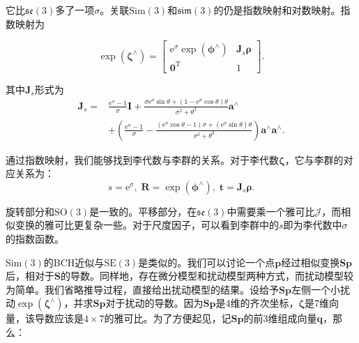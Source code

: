 它比$\mathfrak{se}(3)$多了一项$\sigma$。关联$\mathrm{Sim}(3)$和$\mathfrak{sim}(3)$的仍是指数映射和对数映射。指数映射为

\begin{equation}
\exp \left( {{ \boldsymbol{\zeta} ^ \wedge }} \right) = \left[ {\begin{array}{*{20}{c}}
	{{\mathrm{e}^\sigma }\exp \left( {{ \boldsymbol{\phi} ^ \wedge }} \right)}&{ \bm{J}_s \boldsymbol{\rho} }\\
	{{\bm{0}^\mathrm{T}}}&1
	\end{array}} \right].
\end{equation}

其中$\bm{J}_s$形式为
\begin{align*}
{ \bm{J}_s} =& \frac{{{\mathrm{e}^\sigma } - 1}}{\sigma } \bm{I} + \frac{ \sigma {{\mathrm{e}^\sigma }\sin \theta  + \left( {1 - {\mathrm{e}^\sigma }\cos \theta } \right)\theta }}{{{\sigma ^2} + {\theta ^2}}}{\bm{a}^ \wedge }\\
 &+ \left( {\frac{{{\mathrm{e}^\sigma } - 1}}{\sigma } - \frac{{\left( {{\mathrm{e}^\sigma }\cos \theta  - 1} \right)\sigma  + ({\mathrm{e}^\sigma }\sin \theta )\theta }}{{{\sigma ^2} + {\theta ^2}}}} \right){\bm{a}^ \wedge }{\bm{a}^ \wedge }.
\end{align*}

通过指数映射，我们能够找到李代数与李群的关系。对于李代数$\boldsymbol{\zeta}$，它与李群的对应关系为：
\begin{equation}
s=\mathrm{e}^\sigma, \; \bm{R} = \exp( \boldsymbol{\phi} ^\wedge), \; \bm{t} = \bm{J}_s \boldsymbol{\rho}.
\end{equation}

旋转部分和$\mathrm{SO}(3)$是一致的。平移部分，在$\mathfrak{se}(3)$中需要乘一个雅可比$\bm{\mathcal{J}}$，而相似变换的雅可比更复杂一些。对于尺度因子，可以看到李群中的$s$即为李代数中$\sigma$的指数函数。

$\mathrm{Sim}(3)$的BCH近似与$\mathrm{SE}(3)$是类似的。我们可以讨论一个点$\bm{p}$经过相似变换$\bm{S} \bm{p}$后，相对于$\bm{S}$的导数。同样地，存在微分模型和扰动模型两种方式，而扰动模型较为简单。我们省略推导过程，直接给出扰动模型的结果。设给予$\bm{S} \bm{p}$左侧一个小扰动$\exp( \boldsymbol{\zeta} ^\wedge )$，并求$\bm{S} \bm{p}$对于扰动的导数。因为$\bm{S} \bm{p}$是4维的齐次坐标，$\boldsymbol{\zeta}$是7维向量，该导数应该是$4 \times 7$的雅可比。为了方便起见，记$\bm{Sp}$的前3维组成向量$\bm{q}$，那么：

